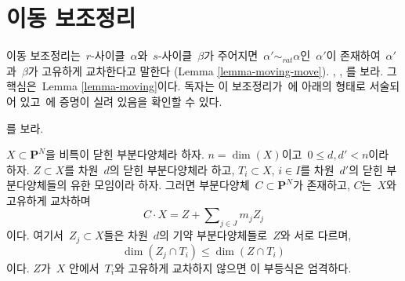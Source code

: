 \section{이동 보조정리}
\label{section-moving-lemma}

\noindent
이동 보조정리는\  $r$-사이클\  $\alpha$와\  $s$-사이클\ 
$\beta$가 주어지면\  $\alpha' \sim_{rat} \alpha$인\  $\alpha'$이 존재하여\ 
$\alpha'$과\  $\beta$가 고유하게 교차한다고 말한다
(Lemma \ref{lemma-moving-move}).
\cite{Samuel}, \cite{ChevalleyI}, \cite{ChevalleyII}를 보라.
그 핵심은\  Lemma \ref{lemma-moving}이다. 독자는 이 보조정리가\ 
\cite[Example 11.4.1]{F}에 아래의 형태로 서술되어 있고\ 
\cite{Roberts}에 증명이 실려 있음을 확인할 수 있다.

\begin{lemma}
\label{lemma-moving}
\begin{reference}
\cite{Roberts}를 보라.
\end{reference}
$X \subset \mathbf{P}^N$을 비특이 닫힌 부분다양체라 하자.
$n = \dim(X)$이고\  $0 \leq d, d' < n$이라 하자. $Z \subset X$를
차원\  $d$의 닫힌 부분다양체라 하고, $T_i \subset X$, $i \in I$를
차원\  $d'$의 닫힌 부분다양체들의 유한 모임이라 하자. 그러면
부분다양체\  $C \subset \mathbf{P}^N$가 존재하고, $C$는\  $X$와
고유하게 교차하며
$$
C \cdot X = Z + \sum\nolimits_{j \in J} m_j Z_j
$$
이다. 여기서\  $Z_j \subset X$들은 차원\  $d$의 기약 부분다양체들로\ 
$Z$와 서로 다르며,
$$
\dim(Z_j \cap T_i) \leq \dim(Z \cap T_i)
$$
이다. $Z$가\  $X$ 안에서\  $T_i$와 고유하게 교차하지 않으면 이 부등식은
엄격하다.
\end{lemma}

